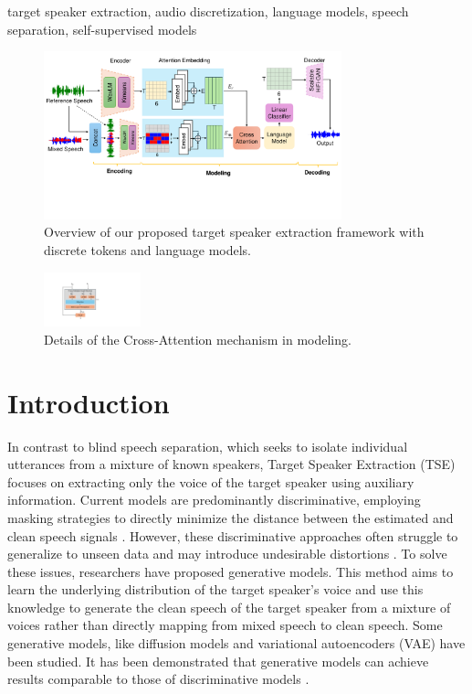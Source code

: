 \documentclass[conference]{IEEEtran}
\begin{document}
\begin{IEEEkeywords}
target speaker extraction, audio discretization, language models, speech separation, self-supervised models
\end{IEEEkeywords}
\begin{figure}[t]
    \centering
    \includegraphics[width=0.77\textwidth]{assets/model.pdf}
    \caption{Overview of our proposed target speaker extraction framework with discrete tokens and language models.}
    \label{model}
    \vspace{-4pt}
    \end{figure}

    \begin{figure}
        \centering
        \includegraphics[width=0.25\textwidth]{assets/cross_attention.pdf}
        \caption{Details of the Cross-Attention mechanism in modeling.}
        \label{cross_attention}
        \vspace{-5pt}
        \end{figure}


        
\section{Introduction}

In contrast to blind speech separation, which seeks to isolate individual utterances from a mixture of known speakers, Target Speaker Extraction (TSE) focuses on extracting only the voice of the target speaker using auxiliary information. Current models are predominantly discriminative, employing masking strategies to directly minimize the distance between the estimated and clean speech signals \cite{luo2019conv,spex_plus,sepformer,sef_net}. However, these discriminative approaches often struggle to generalize to unseen data and may introduce undesirable distortions \cite{distortion}. To solve these issues, researchers have proposed generative models. This method aims to learn the underlying distribution of the target speaker's voice and use this knowledge to generate the clean speech of the target speaker from a mixture of voices rather 
than directly mapping from mixed speech to clean speech. Some generative models, like diffusion
models \cite{target_diff} and variational autoencoders (VAE) \cite{vae} have been studied. It has been demonstrated that generative models can achieve results comparable to those of discriminative models \cite{target_diff,tokensplit}.
\end{document}
